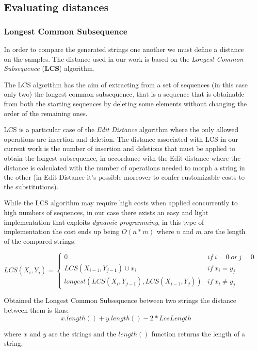 \subsection{Evaluating distances}

\subsubsection{Longest Common Subsequence} 

In order to compare the generated strings one another we must define a distance on the samples.
The distance used in our work is based on the \emph{Longest Common Subsequence} (\textbf{LCS}) algorithm. 

The LCS algorithm has the aim of extracting from a set of sequences (in this case only two) the longest common subsequence, that is a sequence that is obtainable from both the starting sequences by deleting some elements without changing the order of the remaining ones.

LCS is a particular case of the \emph{Edit Distance} algorithm where the only allowed operations are insertion and deletion.
The distance associated with LCS in our current work is the number of insertion and deletions that must be applied to obtain the longest subsequence, in accordance with the Edit distance where the distance is calculated with the number of operations needed to morph a string in the other (in Edit Distance it's possible moreover to confer customizable costs to the substitutions).   

While the LCS algorithm may require high costs when applied concurrently to high numbers of sequences, in our case there exists an easy and light implementation that exploits \textit{dynamic programming}, in this type of implementation the cost ends up being $O(n*m)$ where $n$ and $m$ are the length of the compared strings.  


$$\label{LCS}
LCS(X_i,Y_j) =
 \left\{\begin{array}{ll}
 \displaystyle
 0 & if~i=0~ or~ j=0\\
 LCS(X_{i-1},Y_{j-1})\cup x_i & if~ x_i=y_j\\
 longest(LCS(X_i,Y_{j-1}), LCS(X_{i-1},Y_j)) & if~ x_i\neq y_j
 \end{array}\right.
$$


Obtained the Longest Common Subsequence between two strings the distance between them is thus:
$$ x.length() + y.length() - 2*LcsLength$$

where $x$ and $y$ are the strings and the $length()$ function returns the length of a string.

